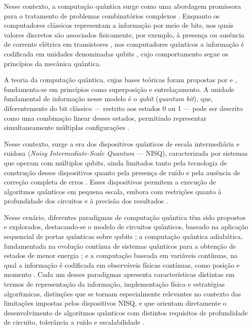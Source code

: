 Nesse contexto, a computação quântica surge como uma abordagem promissora para o tratamento de problemas combinatórios complexos \cite{albash2018adiabatic}. Enquanto os computadores clássicos representam a informação por meio de bits, nos quais valores discretos são associados fisicamente, por exemplo, à presença ou ausência de corrente elétrica em transistores \cite{shannon1948mathematical, sedra2011microelectronic}, nos computadores quânticos a informação é codificada em unidades denominadas qubits \cite{benioff1980computer, nielsen_quantum_2002}, cujo comportamento segue os princípios da mecânica quântica.

A teoria da computação quântica, cujas bases teóricas foram propostas por \textcite{benioff1980computer} e \textcite{feynman1982simulating}, fundamenta-se em princípios como superposição e entrelaçamento. A unidade fundamental de informação nesse modelo é o \textit{qubit} (\textit{quantum bit}), que, diferentemente do bit clássico — restrito aos estados 0 ou 1 — pode ser descrito como uma combinação linear desses estados, permitindo representar simultaneamente múltiplas configurações \cite{nielsen_quantum_2002}.

Nesse contexto, surge a era dos dispositivos quânticos de escala intermediária e ruidosa (\textit{Noisy Intermediate-Scale Quantum} — NISQ), caracterizada por sistemas que operam com múltiplos qubits, ainda limitados tanto pela tecnologia de construção desses dispositivos quanto pela presença de ruído e pela ausência de correção completa de erros \cite{preskill2019quantum}. Esses dispositivos permitem a execução de algoritmos quânticos em pequena escala, embora com restrições quanto à profundidade dos circuitos e à precisão dos resultados \cite{bharti2022noisy, cheng2023noisy}.

Nesse cenário, diferentes paradigmas de computação quântica têm sido propostos e explorados, destacando-se o modelo de circuitos quânticos, baseado na aplicação sequencial de portas quânticas sobre qubits \cite{nielsen_quantum_2002}; a computação quântica adiabática, fundamentada na evolução contínua de sistemas quânticos para a obtenção de estados de menor energia \cite{albash2018adiabatic}; e a computação baseada em variáveis contínuas, na qual a informação é codificada em observáveis físicas contínuas, como posição e momento \cite{weedbrook2012gaussian}. Cada um desses paradigmas apresenta características distintas em termos de representação da informação, implementação física e estratégias algorítmicas, distinções que se tornam especialmente relevantes no contexto das limitações impostas pelos dispositivos NISQ, e que orientam diretamente o desenvolvimento de algoritmos quânticos com distintos requisitos de profundidade de circuito, tolerância a ruído e escalabilidade \cite{montanaro2016quantum}.

